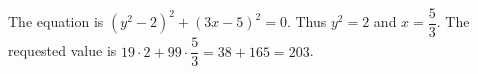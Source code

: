 The equation is $(y^2-2)^2+(3x-5)^2=0$. Thus $y^2=2$ and $x=\dfrac{5}{3}$. The requested value is $19\cdot2+99\cdot\dfrac{5}{3}=38+165=\boxed{203}$.

